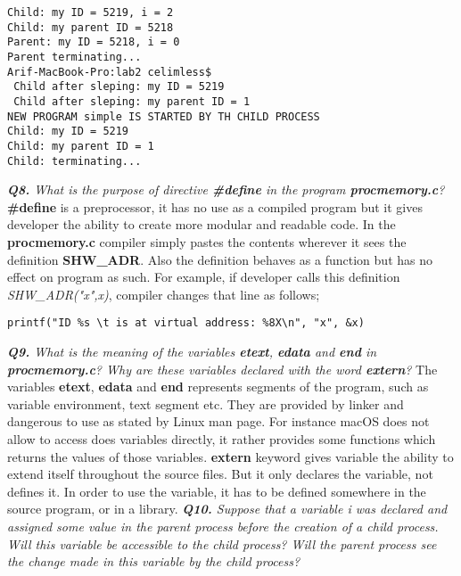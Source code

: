 \documentclass[11pt]{article}
\begin{document}
\begin{lstlisting}[frame=tlrb]
Child: my ID = 5219, i = 2
Child: my parent ID = 5218
Parent: my ID = 5218, i = 0
Parent terminating...
Arif-MacBook-Pro:lab2 celimless$ 
 Child after sleping: my ID = 5219
 Child after sleping: my parent ID = 1
NEW PROGRAM simple IS STARTED BY TH CHILD PROCESS
Child: my ID = 5219
Child: my parent ID = 1
Child: terminating...
\end{lstlisting}
\vspace{5mm}
\textit{\textbf{Q8.} What is the purpose of directive \textbf{\#define} in the program \textbf{procmemory.c}?}
\vspace{5mm}
\textbf{\#define} is a preprocessor, it has no use as a compiled program but it gives developer the ability to create more modular and readable code. In the \textbf{procmemory.c} compiler simply pastes the contents wherever it sees the definition \textbf{SHW\_ADR}. Also the definition behaves as a function but has no effect on program as such.
For example, if developer calls this definition \textit{SHW\_ADR("x",x)}, compiler changes that line as follows; 
\begin{lstlisting}[frame=tlrb]
printf("ID %s \t is at virtual address: %8X\n", "x", &x)
\end{lstlisting}
\vspace{5mm}
\textit{\textbf{Q9.} What is the meaning of the variables \textbf{etext}, \textbf{edata} and \textbf{end} in \textbf{procmemory.c}? Why are these variables declared with the word \textbf{extern}?}
\vspace{3mm}
The variables \textbf{etext}, \textbf{edata} and \textbf{end} represents segments of the program, such as variable environment, text segment etc. They are provided by linker and dangerous to use as stated by Linux man page. For instance macOS does not allow to access does variables directly, it rather provides some functions which returns the values of those variables.
\textbf{extern} keyword gives variable the ability to extend itself throughout the source files. But it only declares the variable, not defines it. In order to use the variable, it has to be defined somewhere in the source program, or in a library.
\vspace{5mm}
\newpage
\textit{\textbf{Q10.} Suppose that a variable i was declared and assigned some value in the parent process before the creation of a child process. Will this variable be accessible to the child process? Will the parent process see the change made in this variable by the child process?}
\vspace{5mm}
\end{document}
